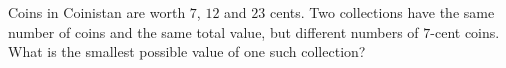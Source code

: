 Coins in Coinistan are worth $7$, $12$ and $23$ cents. Two collections have the same number of coins and the same total value, but different numbers of $7$-cent coins. What is the smallest possible value of one such collection?
